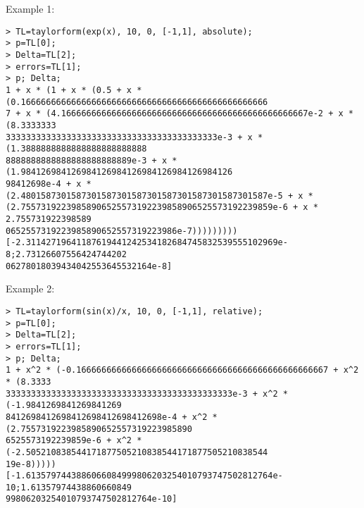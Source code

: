 \noindent Example 1: 
\begin{center}\begin{minipage}{15cm}\begin{Verbatim}[frame=single]
> TL=taylorform(exp(x), 10, 0, [-1,1], absolute);
> p=TL[0];
> Delta=TL[2];
> errors=TL[1];
> p; Delta;
1 + x * (1 + x * (0.5 + x * (0.1666666666666666666666666666666666666666666666666
7 + x * (4.1666666666666666666666666666666666666666666666667e-2 + x * (8.3333333
333333333333333333333333333333333333333333e-3 + x * (1.3888888888888888888888888
8888888888888888888888889e-3 + x * (1.984126984126984126984126984126984126984126
98412698e-4 + x * (2.4801587301587301587301587301587301587301587301587e-5 + x * 
(2.75573192239858906525573192239858906525573192239859e-6 + x * 2.755731922398589
0652557319223985890652557319223986e-7)))))))))
[-2.31142719641187619441242534182684745832539555102969e-8;2.73126607556424744202
06278018039434042553645532164e-8]
\end{Verbatim}
\end{minipage}\end{center}
\noindent Example 2: 
\begin{center}\begin{minipage}{15cm}\begin{Verbatim}[frame=single]
> TL=taylorform(sin(x)/x, 10, 0, [-1,1], relative);
> p=TL[0];
> Delta=TL[2];
> errors=TL[1];
> p; Delta;
1 + x^2 * (-0.16666666666666666666666666666666666666666666666667 + x^2 * (8.3333
333333333333333333333333333333333333333333333e-3 + x^2 * (-1.9841269841269841269
8412698412698412698412698412698e-4 + x^2 * (2.7557319223985890652557319223985890
6525573192239859e-6 + x^2 * (-2.505210838544171877505210838544171877505210838544
19e-8)))))
[-1.6135797443886066084999806203254010793747502812764e-10;1.61357974438860660849
99806203254010793747502812764e-10]
\end{Verbatim}
\end{minipage}\end{center}
